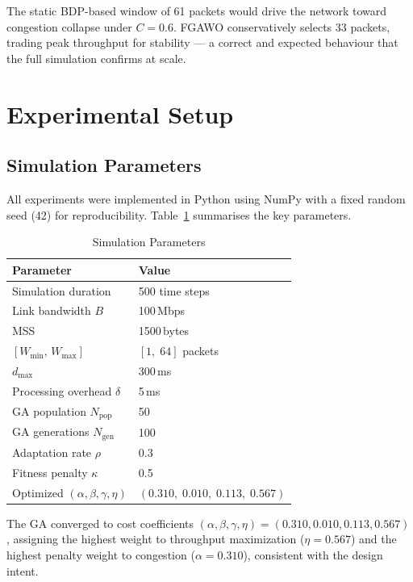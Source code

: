 \documentclass[10pt, twocolumn]{IEEEtran}
\theoremstyle{definition}
\begin{document}
The static BDP-based window of 61 packets would drive the network toward congestion collapse under $C=0.6$. FGAWO conservatively selects 33 packets, trading peak throughput for stability — a correct and expected behaviour that the full simulation confirms at scale.

\section{Experimental Setup}
\label{sec:setup}

\subsection{Simulation Parameters}

All experiments were implemented in Python using NumPy with a fixed random seed (42) for reproducibility. Table~\ref{tab:params} summarises the key parameters.

\begin{table}[h]
\centering
\caption{Simulation Parameters}
\label{tab:params}
\small
\begin{tabular}{ll}
\toprule
Parameter & Value \\
\midrule
Simulation duration             & 500 time steps \\
Link bandwidth $B$              & 100\,Mbps \\
MSS                             & 1500\,bytes \\
$[W_{\min},\, W_{\max}]$        & $[1,\; 64]$ packets \\
$d_{\max}$                      & 300\,ms \\
Processing overhead $\delta$    & 5\,ms \\
GA population $N_{\text{pop}}$  & 50 \\
GA generations $N_{\text{gen}}$ & 100 \\
Adaptation rate $\rho$          & 0.3 \\
Fitness penalty $\kappa$        & 0.5 \\
Optimized $(\alpha,\beta,\gamma,\eta)$ & $(0.310,\; 0.010,\; 0.113,\; 0.567)$ \\
\bottomrule
\end{tabular}
\end{table}

The GA converged to cost coefficients $(\alpha, \beta, \gamma, \eta) = (0.310, 0.010, 0.113, 0.567)$, assigning the highest weight to throughput maximization ($\eta = 0.567$) and the highest penalty weight to congestion ($\alpha = 0.310$), consistent with the design intent.
\end{document}
